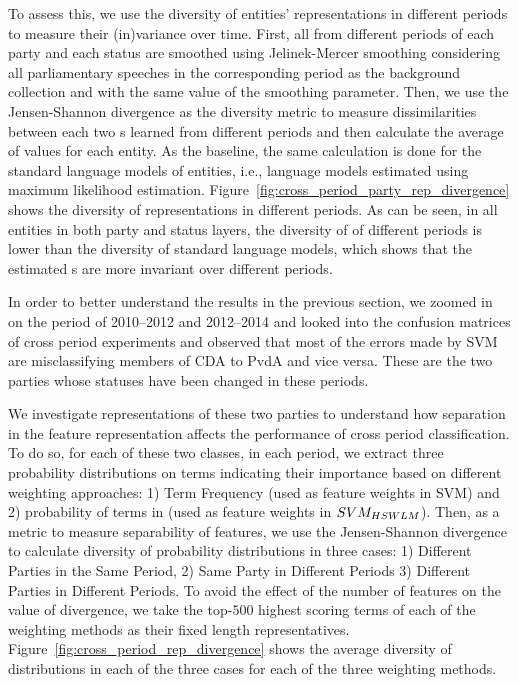 To assess this, we use the diversity of entities' representations in different periods to measure their (in)variance over time.
%
First, all \achswlms from different periods of each party and each status are smoothed using Jelinek-Mercer smoothing \citep{Zhai:2001} considering all parliamentary speeches in the corresponding period as the background collection and with the same value of the smoothing parameter. Then, we use the Jensen-Shannon divergence as the diversity metric to measure dissimilarities between each two {\achswlm}s learned from different periods and then calculate the average of values for each entity. As the baseline, the same calculation is done for the standard language models of entities, i.e., language models estimated using maximum likelihood estimation. 
Figure~\ref{fig:cross_period_party_rep_divergence} shows the diversity of representations in different periods.
%
As can be seen, in all entities in both party and status layers, the diversity of \achswlm of different periods is lower than the diversity of standard language models, which shows that the estimated {\achswlm}s are more invariant over different periods. 


In order to better understand the results in the previous section, we zoomed in on the period of 2010--2012 and 2012--2014 and looked into the confusion matrices of cross period experiments and observed that most of the errors made by SVM are misclassifying members of CDA to PvdA and vice versa. These are the two parties whose statuses have been changed in these periods.  


We investigate representations of these two parties to understand how separation in the feature representation affects the performance of cross period classification. To do so, for each of these two classes, in each period, we extract three probability distributions on terms indicating their importance based on different weighting approaches: 1) Term Frequency (used as feature weights in SVM) and 2) probability of terms in \achswlm (used as feature weights in $SVM_{HSWLM}$). 
Then, as a metric to measure separability of features, we use the Jensen-Shannon divergence to calculate diversity of probability distributions in three cases: 1) Different Parties in the Same Period, 2) Same Party in Different Periods 3) Different Parties in Different Periods. 
To avoid the effect of the number of features on the value of divergence, we take the top-$500$ highest scoring terms of each of the weighting methods as their fixed length representatives. Figure~\ref{fig:cross_period_rep_divergence} shows the average diversity of distributions in each of the three cases for each of the three weighting methods.


